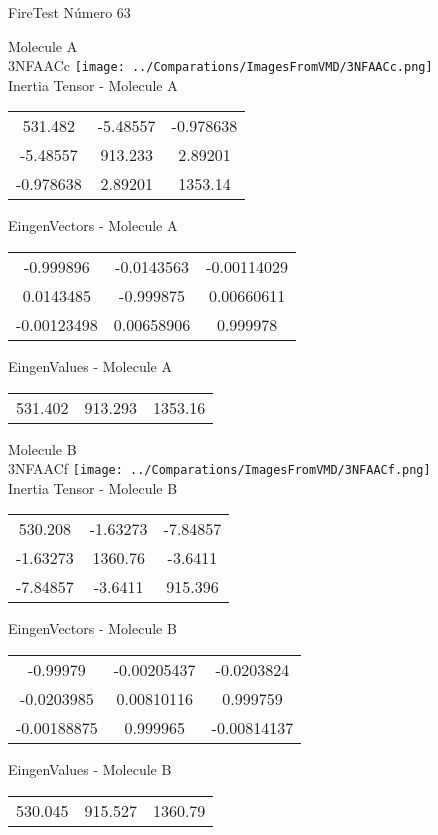 \vtab[-2cm]
\begin{center}
{\large FireTest \tab Número 63}
\end{center}
\begin{multicols}{2}
\begin{center}

Molecule A \\ 
3NFAACc
\texttt{[image: ../Comparations/ImagesFromVMD/3NFAACc.png]}
\\
Inertia Tensor - Molecule A \\
\vtab

\begin{tabular}{|c c c|}
531.482	 & 	-5.48557	 & 	-0.978638	 \\
-5.48557	 & 	913.233	 & 	2.89201	 \\
-0.978638	 & 	2.89201	 & 	1353.14
\end{tabular}

\vtab
 EingenVectors - Molecule A     \\
\vtab
\begin{tabular}{|c c c|}
-0.999896	 & 	-0.0143563	 & 	-0.00114029	 \\
0.0143485	 & 	-0.999875	 & 	0.00660611	 \\
-0.00123498	 & 	0.00658906	 & 	0.999978
\end{tabular}

\vtab
 EingenValues - Molecule A     \\
\vtab
\begin{tabular}{|c c c|}
531.402	 & 	913.293	 & 	1353.16	 \\
\end{tabular}
\columnbreak

Molecule B \\ 
3NFAACf
\texttt{[image: ../Comparations/ImagesFromVMD/3NFAACf.png]}
\\
Inertia Tensor - Molecule B \\
\vtab

\begin{tabular}{|c c c|}
530.208	 & 	-1.63273	 & 	-7.84857	 \\
-1.63273	 & 	1360.76	 & 	-3.6411	 \\
-7.84857	 & 	-3.6411	 & 	915.396
\end{tabular}

\vtab
 EingenVectors - Molecule B     \\
\vtab
\begin{tabular}{|c c c|}
-0.99979	 & 	-0.00205437	 & 	-0.0203824	 \\
-0.0203985	 & 	0.00810116	 & 	0.999759	 \\
-0.00188875	 & 	0.999965	 & 	-0.00814137
\end{tabular}

\vtab
 EingenValues - Molecule B     \\
\vtab
\begin{tabular}{|c c c|}
530.045	 & 	915.527	 & 	1360.79	 \\
\end{tabular}

\end{center}
\end{multicols}
